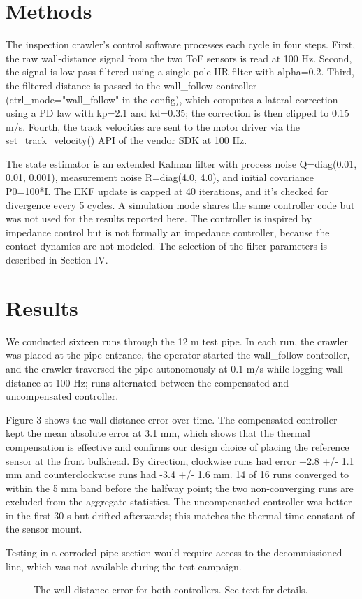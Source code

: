 \section{Methods}

The inspection crawler's control software processes each cycle in four steps. First,
the raw wall-distance signal from the two ToF sensors is read at 100 Hz. Second, the
signal is low-pass filtered using a single-pole IIR filter with alpha=0.2. Third, the
filtered distance is passed to the wall_follow controller (ctrl_mode="wall_follow" in
the config), which computes a lateral correction using a PD law with kp=2.1 and
kd=0.35; the correction is then clipped to 0.15 m/s. Fourth, the track velocities are
sent to the motor driver via the set_track_velocity() API of the vendor SDK at 100 Hz.

The state estimator is an extended Kalman filter with process noise
Q=diag(0.01, 0.01, 0.001), measurement noise R=diag(4.0, 4.0), and initial covariance
P0=100*I. The EKF update is capped at 40 iterations, and it's checked for divergence
every 5 cycles. A simulation mode shares the same controller code but was not used for
the results reported here. The controller is inspired by impedance control but is not
formally an impedance controller, because the contact dynamics are not modeled. The
selection of the filter parameters is described in Section IV.

\section{Results}

We conducted sixteen runs through the 12 m test pipe. In each run, the crawler was
placed at the pipe entrance, the operator started the wall_follow controller, and the
crawler traversed the pipe autonomously at 0.1 m/s while logging wall distance at 100
Hz; runs alternated between the compensated and uncompensated controller.

Figure 3 shows the wall-distance error over time. The compensated controller kept the
mean absolute error at 3.1 mm, which shows that the thermal compensation is effective
and confirms our design choice of placing the reference sensor at the front bulkhead.
By direction, clockwise runs had error +2.8 +/- 1.1 mm and counterclockwise runs had
-3.4 +/- 1.6 mm. 14 of 16 runs converged to within the 5 mm band before the halfway
point; the two non-converging runs are excluded from the aggregate statistics. The
uncompensated controller was better in the first 30 s but drifted afterwards; this
matches the thermal time constant of the sensor mount.

Testing in a corroded pipe section would require access to the decommissioned line,
which was not available during the test campaign.

\begin{figure}
\caption{The wall-distance error for both controllers. See text for details.}
\end{figure}
